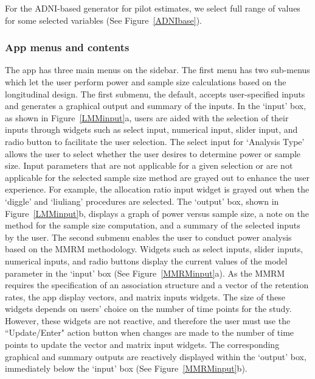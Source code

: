For the ADNI-based generator for pilot estimates, we select full range of values for some selected variables (See Figure~\ref{ADNIbase}). 



\subsubsection{App menus and contents}
The app has three main menus on the sidebar. The first menu has two sub-menus which let the user perform power and sample size calculations based on the longitudinal design. The first submenu, the default, accepts user-specified inputs and generates a graphical output and summary of the inputs. In the `input' box, as shown in Figure~\ref{LMMinput}a, users are aided with the selection of their inputs through widgets such as select input, numerical input, slider input, and radio button to facilitate the user selection. The select input for `Analysis Type' allows the user to select whether the user desires to determine power or sample size. Input parameters that are not applicable for a given selection or are not applicable for the selected sample size method are grayed out to enhance the user experience. For example, the allocation ratio input widget is grayed out when the `diggle' and `liuliang' procedures are selected. The `output' box, shown in Figure~\ref{LMMinput}b, displays a graph of power versus sample size, a note on the method for the sample size computation, and a summary of the selected inputs by the user. The second submenu enables the user to conduct power analysis based on the MMRM methodology. Widgets such as select inputs, slider inputs, numerical inputs, and radio buttons display the current values of the model parameter in the `input' box (See Figure~\ref{MMRMinput}a). As the MMRM requires the specification of an association structure and a vector of the retention rates, the app display vectors, and matrix inputs widgets. The size of these widgets depends on users' choice on the number of time points for the study. However, these widgets are not reactive, and therefore the user must use the ``Update/Enter" action button when changes are made to the number of time points to update the vector and matrix input widgets. The corresponding graphical and summary outputs are reactively displayed within the `output' box, immediately below the `input’ box (See Figure~\ref{MMRMinput}b). 

